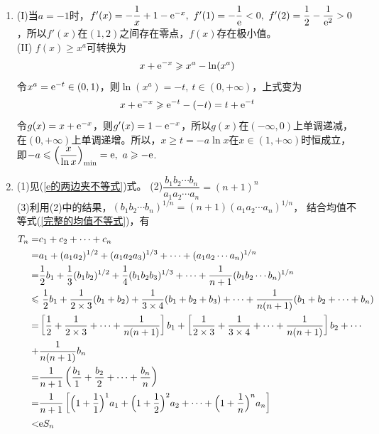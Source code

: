 \begin{enumerate}[label={\textbf{\arabic*.}},leftmargin=
    \inteval{\myenumleftmargin}pt]
\item (I)当$ a=-1 $时，$ f'(x)=-\dfrac{1}{x}+1-\e^{-x},\ f'(1)=-\dfrac{1}{\e}<0,\ f'(2)=\dfrac{1}{2}-\dfrac{1}{\e^2}>0 $，所以$ f'(x) $在$ (1,2) $之间存在零点，$ f(x) $存在极小值。\\
(II) $ f(x)\geq x^a $可转换为
\begin{gather*}
    x+\mathrm{e}^{-x} \geqslant x^a -\ln (x^a) 	
\end{gather*}
令$ x^a=\mathrm{e}^{-t}\in (0,1) $，则$ \ln (x^a) =-t,\ t\in(0,+\infty) $，上式变为
\begin{gather*}
    x+\mathrm{e}^{-x} \geqslant \mathrm{e}^{-t}-(-t)=t+\mathrm{e}^{-t} 
\end{gather*}
令$ g(x)=x+\mathrm{e}^{-x} $，则$ g'(x)=1-\mathrm{e}^{-x} $，所以$ g(x) $在$ (-\infty,0) $上单调递减，在$ (0,+\infty) $上单调递增。所以，$ x\geq t =-a\ln x $在$ x\in(1,+\infty) $时恒成立，即$ -a\leq \left(\dfrac{x}{\ln x}\right)_{\min}=\e,\ a\geq -\e $. 

\item 
(1)见(\ref{e的两边夹不等式})式。 \quad (2)$ \dfrac{b_1b_2\cdots b_n}{a_1a_2\cdots a_n}=(n+1)^n $  \\
(3)利用(2)中的结果，$ (b_1b_2\cdots b_n)^{1/n}=(n+1)(a_1a_2\cdots a_n)^{1/n} $，
结合均值不等式(\ref{完整的均值不等式})，有
\begin{align*}
    T_n=&c_1+c_2+\cdots +c_n \\
    =&a_1+(a_1a_2)^{1/2}+(a_1a_2a_3)^{1/3}+\cdots + (a_1a_2\cdots a_n)^{1/n}\\
    =&\dfrac{1}{2}b_1+\dfrac{1}{3}(b_1b_2)^{1/2}+\dfrac{1}{4}(b_1b_2b_3)^{1/3}+
    \cdots+\dfrac{1}{n+1}(b_1b_2\cdots b_n)^{1/n} \\
    \leqslant &\ \dfrac{1}{2}b_1+\dfrac{1}{2\times 3}(b_1+b_2)+\dfrac{1}{3\times 4}(b_1+
    b_2+b_3)+\cdots +\dfrac{1}{n(n+1)}(b_1+b_2+\cdots +b_n) \\
    =&\left[\dfrac{1}{2}+\dfrac{1}{2\times 3}+\cdots+\dfrac{1}{n(n+1)}\right]b_1+
    \left[\dfrac{1}{2\times 3}+\dfrac{1}{3\times 4}+\cdots+\dfrac{1}{n(n+1)}\right]b_2+
    \cdots\\
    +&\dfrac{1}{n(n+1)}b_n \\
    =&\dfrac{1}{n+1}\left(\dfrac{b_1}{1}+\dfrac{b_2}{2}+\cdots+\dfrac{b_n}{n}\right) \\
    =&\dfrac{1}{n+1}\left[\Big(1+\dfrac{1}{1}\Big)^1 a_1+\Big(1+\dfrac{1}{2}\Big)^2 a_2+\cdots+\Big(1+\dfrac{1}{n}\Big)^n a_n \right] \\
    <& \mathrm{e} S_n
\end{align*}


\end{enumerate}
